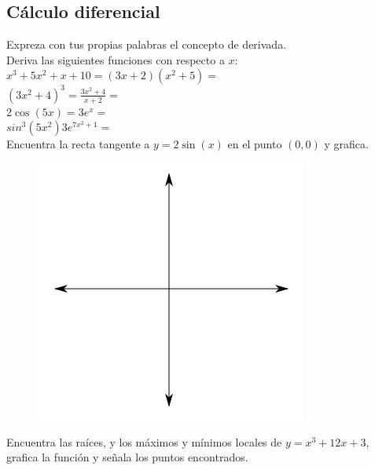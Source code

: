 \documentclass[a4paper,10pt]{article}
\begin{document}
\subsection*{Cálculo diferencial}
Expreza con tus propias palabras el concepto de derivada.
\vspace{3cm}\\
Deriva las siguientes funciones con respecto a $x$:
\vspace{0.5cm}\\
$x^3+5x^2+x+10=$\hspace{3cm}$(3x+2)(x^2+5)=$\hspace{3cm}
\vspace{1cm}\\
$(3x^2+4)^3=$\hspace{4cm}$\frac{3x^2+4}{x+2}=$
\vspace{1.5cm}\\
$2\cos(5x)=$\hspace{4cm}$3e^x=$
\vspace{1.5cm}\\
$sin^3(5x^2)$\hspace{4cm}$3e^{7x^2+1}=$
\vspace{1.5cm}\\
Encuentra la recta tangente a $y=2\sin(x)$ en el punto $(0,0)$ y grafica.
\begin{figure}[H]
\includegraphics[scale=0.5]{plot.png}
\end{figure}
\pagebreak
Encuentra las raíces, y los máximos y mínimos locales de $y=x^3+12x+3$, grafica la función y señala los puntos encontrados. 
\end{document}

